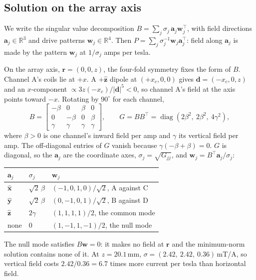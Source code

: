 \documentclass[11pt]{article}
\newcommand{\R}{\mathbb{R}}
\newcommand{\vb}[1]{\mathbf{#1}}
\newcommand{\uv}[1]{\hat{\mathbf{#1}}}
\begin{document}
\subsection{Solution on the array axis}
We write the singular value decomposition $B = \sum_j\sigma_j\,\vb a_j\vb w_j^\top$, with field
directions $\vb a_j\in\R^3$ and drive patterns $\vb w_j\in\R^4$. Then
$P = \sum_j\sigma_j^{-1}\vb w_j\vb a_j^\top$: field along $\vb a_j$ is made by the pattern
$\vb w_j$ at $1/\sigma_j$ amps per tesla.

On the array axis, $\vb r = (0,0,z)$, the four-fold symmetry fixes the form of $B$. Channel A's
coils lie at $+x$. A $+\uv z$ dipole at $(+x_c,0,0)$ gives $\vb d = (-x_c,0,z)$ and an
$x$-component $\propto 3z(-x_c)/|\vb d|^5<0$, so channel A's field at the axis points toward $-x$.
Rotating by $90^\circ$ for each channel,
\begin{equation}
  B = \begin{bmatrix} -\beta & 0 & \beta & 0\\ 0 & -\beta & 0 & \beta\\ \gamma&\gamma&\gamma&\gamma
  \end{bmatrix},
  \qquad
  G = BB^\top = \operatorname{diag}(2\beta^2,\ 2\beta^2,\ 4\gamma^2),
\end{equation}
where $\beta>0$ is one channel's inward field per amp and $\gamma$ its vertical field per amp. The
off-diagonal entries of $G$ vanish because $\gamma(-\beta+\beta) = 0$. $G$ is diagonal, so the
$\vb a_j$ are the coordinate axes, $\sigma_j = \sqrt{G_{jj}}$, and
$\vb w_j = B^\top\vb a_j/\sigma_j$:
\begin{center}
\begin{tabular}{lll}\toprule
$\vb a_j$ & $\sigma_j$ & $\vb w_j$\\\midrule
$\uv x$ & $\sqrt2\,\beta$ & $(-1,0,1,0)/\sqrt2$, A against C\\
$\uv y$ & $\sqrt2\,\beta$ & $(0,-1,0,1)/\sqrt2$, B against D\\
$\uv z$ & $2\gamma$ & $(1,1,1,1)/2$, the common mode\\
none & $0$ & $(1,-1,1,-1)/2$, the null mode\\\bottomrule
\end{tabular}
\end{center}
The null mode satisfies $B\vb w = 0$: it makes no field at $\vb r$ and the minimum-norm solution
contains none of it. At $z = 20.1$\,mm, $\sigma = (2.42,\ 2.42,\ 0.36)$\,mT/A, so vertical field
costs $2.42/0.36 = 6.7$ times more current per tesla than horizontal field.
\end{document}
